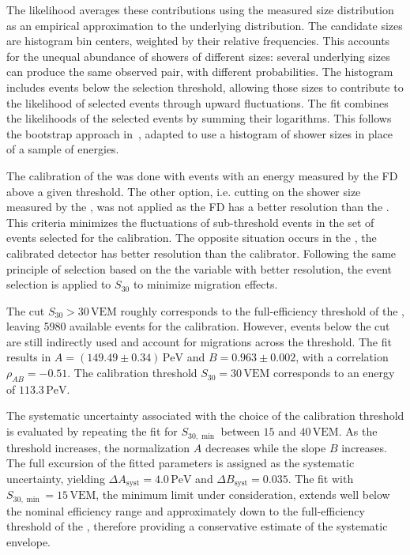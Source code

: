 \documentclass[main.tex]{subfiles}
\begin{document}
{{{The likelihood averages these contributions using the measured size distribution as an empirical approximation to the underlying distribution. The candidate sizes are histogram bin centers, weighted by their relative frequencies. This accounts for the unequal abundance of showers of different sizes: several underlying sizes can produce the same observed pair, with different probabilities. The histogram includes events below the selection threshold, allowing those sizes to contribute to the likelihood of selected events through upward fluctuations. The fit combines the likelihoods of the selected events by summing their logarithms.
This follows the bootstrap approach in~\cite{Dembinski:2013:Unfolding}, adapted to use a histogram of shower sizes in place of a sample of energies.


The calibration of the  was done with events with an energy measured by the FD above a given threshold. The other option, i.e. cutting on the shower size measured by the , was not applied as the FD has a better resolution than the . This criteria minimizes the fluctuations of sub-threshold events in the set of events selected for the calibration.
The opposite situation occurs in the , the calibrated detector has better resolution than the calibrator. Following the same principle of selection based on the the variable with better resolution, the event selection is applied to $S_{30}$ to minimize migration effects.

The cut $S_{30}>30\,\mathrm{VEM}$ roughly corresponds to the full-efficiency threshold of the , leaving \num{5980} available events for the calibration.
However, events below the cut are still indirectly used and account for migrations across the threshold.
The fit results in $A=(149.49\pm0.34)\,\mathrm{PeV}$ and $B=0.963\pm0.002$, with a correlation $\rho_{AB}=-0.51$.
The calibration threshold $S_{30}=30\,\mathrm{VEM}$ corresponds to an energy of $113.3\,\mathrm{PeV}$.

The systematic uncertainty associated with the choice of the calibration threshold is evaluated by repeating the fit for $S_{30,\min}$ between $15$ and $40\,\mathrm{VEM}$.
As the threshold increases, the normalization $A$ decreases while the slope $B$ increases.
The full excursion of the fitted parameters is assigned as the systematic uncertainty, yielding $\Delta A_{\mathrm{syst}}=4.0\,\mathrm{PeV}$ and $\Delta B_{\mathrm{syst}}=0.035$.
The fit with $S_{30,\min}=15\,\mathrm{VEM}$, the minimum limit under consideration, extends well below the nominal  efficiency range and approximately down to the full-efficiency threshold of the , therefore providing a conservative estimate of the systematic envelope.

}}}
\end{document}
